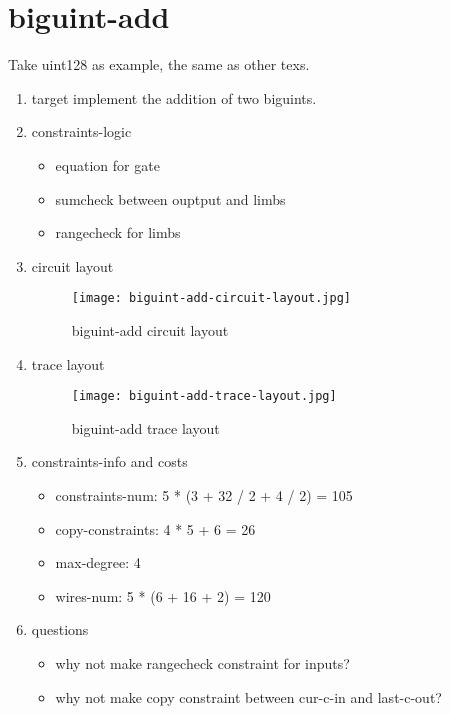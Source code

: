 \section{biguint-add}
\label{biguint-add}

Take uint128 as example, the same as other texs.

\begin{enumerate}
    \item target
        implement the addition of two biguints.
    \item constraints-logic
        \begin{itemize}
            \item equation for gate
            \item sumcheck between ouptput and limbs
            \item rangecheck for limbs
        \end{itemize}
    \item circuit layout
        \begin{figure}[!ht]
            \centering
            \texttt{[image: biguint-add-circuit-layout.jpg]}
            \caption{biguint-add circuit layout}
            \label{fig:biguint-add-circuit-layout}
        \end{figure}

    \item trace layout
        \begin{figure}[!ht]
            \centering
            \texttt{[image: biguint-add-trace-layout.jpg]}
            \caption{biguint-add trace layout}
            \label{fig:biguint-add-trace-layout}
        \end{figure}
    
    \item constraints-info and costs
        \begin{itemize}
            \item constraints-num: 5 * (3 + 32 / 2 + 4 / 2) = 105
            \item copy-constraints: 4 * 5 + 6 = 26
            \item max-degree: 4
            \item wires-num: 5 * (6 + 16 + 2) = 120
        \end{itemize}

    \item questions
        \begin{itemize}
            \item why not make rangecheck constraint for inputs?
            \item why not make copy constraint between cur-c-in and last-c-out?
        \end{itemize}

\end{enumerate}